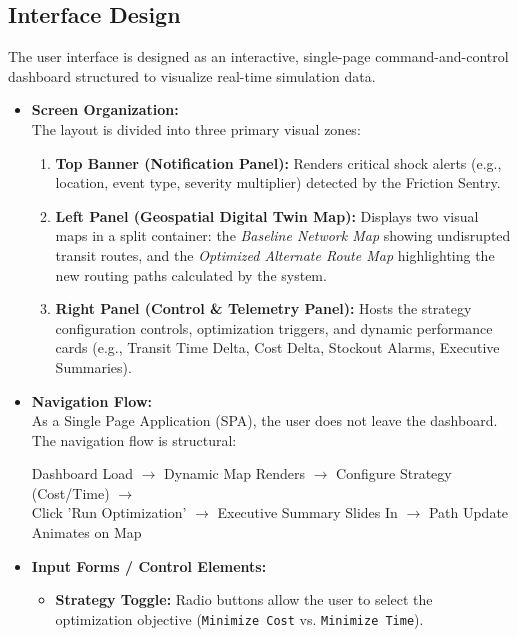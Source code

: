 \subsection[Interface Design]{Interface Design}

The user interface is designed as an interactive, single-page command-and-control dashboard structured to visualize real-time simulation data.

\begin{itemize}
    \item \textbf{Screen Organization:} \\
    The layout is divided into three primary visual zones:
    \begin{enumerate}
        \item \textbf{Top Banner (Notification Panel):} Renders critical shock alerts (e.g., location, event type, severity multiplier) detected by the Friction Sentry.
        \item \textbf{Left Panel (Geospatial Digital Twin Map):} Displays two visual maps in a split container: the \textit{Baseline Network Map} showing undisrupted transit routes, and the \textit{Optimized Alternate Route Map} highlighting the new routing paths calculated by the system.
        \item \textbf{Right Panel (Control \& Telemetry Panel):} Hosts the strategy configuration controls, optimization triggers, and dynamic performance cards (e.g., Transit Time Delta, Cost Delta, Stockout Alarms, Executive Summaries).
    \end{enumerate}
    \item \textbf{Navigation Flow:} \\
    As a Single Page Application (SPA), the user does not leave the dashboard. The navigation flow is structural:
    \begin{center}
        \small
        Dashboard Load $\rightarrow$ Dynamic Map Renders $\rightarrow$ Configure Strategy (Cost/Time) $\rightarrow$ \\
        Click 'Run Optimization' $\rightarrow$ Executive Summary Slides In $\rightarrow$ Path Update Animates on Map
    \end{center}
    \item \textbf{Input Forms / Control Elements:}
    \begin{itemize}
        \item \textbf{Strategy Toggle:} Radio buttons allow the user to select the optimization objective (\texttt{Minimize Cost} vs. \texttt{Minimize Time}).

\end{itemize}
\end{itemize}
